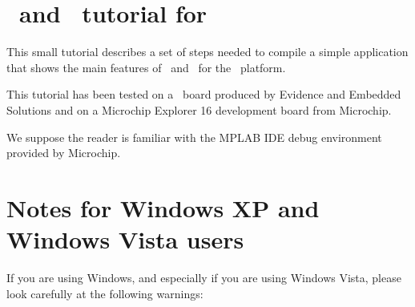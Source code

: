 \chapter{\rtd\ and \ee\ tutorial for \dspic}

This small tutorial describes a set of steps needed to compile a
simple application that shows the main features of \ee\ and \rtd\ for
the \dspic\ platform.

This tutorial has been tested on a \flex\ board produced by Evidence
and Embedded Solutions and on a Microchip Explorer 16 development
board from Microchip.

We suppose the reader is familiar with the MPLAB IDE debug environment
provided by Microchip.

%
%





\chapter{Notes for Windows XP and Windows Vista users}
\label{ch:vista}

If you are using Windows, and especially if you are using Windows
Vista, please look carefully at the following warnings:

